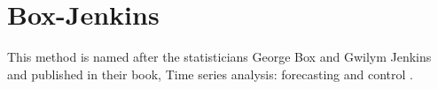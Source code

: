 

\section{Box-Jenkins}
This method is named after the statisticians George Box and Gwilym Jenkins and published in their book, Time series analysis: forecasting and control \cite{boxjenkins}.